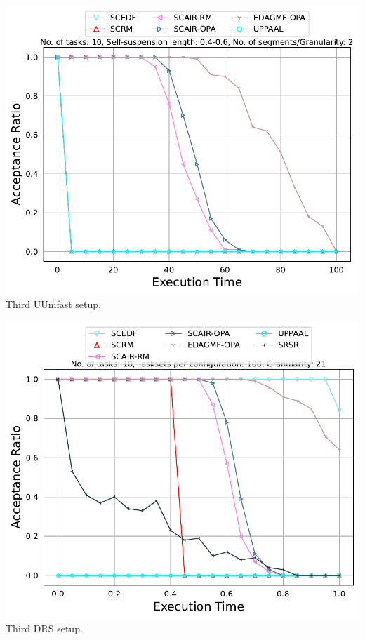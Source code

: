 \documentclass[]{article}
\begin{document}
        \clearpage
        
	\begin{minipage}[t]{0.48\linewidth}
		\centering
			
		\includegraphics[width=\linewidth]{EFFSSTS_UUnifast_3rd[2][0.4-0.6][10].pdf}
		Third UUnifast setup.
		\vspace{0.3cm}
		
		
	\end{minipage}\hfill
	\begin{minipage}[t]{0.48\linewidth}
		\centering
		
                   
		\includegraphics[width=\linewidth]{EFFSSTS_drs_3rd[21][0.01-0.1][10].pdf}
		Third DRS setup.
		\vspace{0.3cm}
	\end{minipage}
\end{document}

